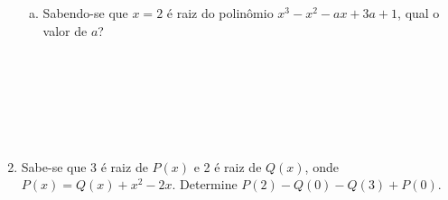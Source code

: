\documentclass[a4paper,14pt]{article}
\begin{document}
\begin{multicols}{2}
\begin{enumerate}
\begin{enumerate}[a)]
        		\item Sabendo-se que $x = 2$ é raiz do polinômio $x^3 - x^2 - ax + 3a + 1$, qual o valor de $a$? \\\\\\\\\\\\\\
        	\end{enumerate}
            \item Sabe-se que 3 é raiz de $P(x)$ e 2 é raiz de $Q(x)$, onde $P(x) = Q(x) + x^2 - 2x$. Determine $P(2) - Q(0) - Q(3) + P(0)$.  \\\\\\\\\\
    	\end{enumerate}
    \end{multicols}
\end{document}
